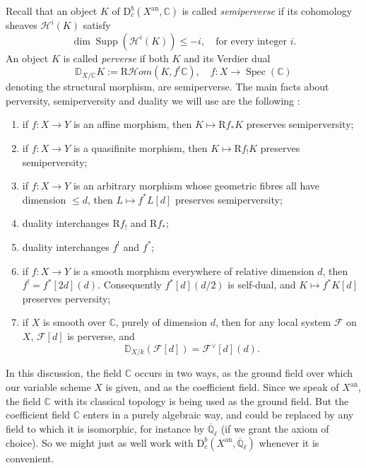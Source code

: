 Recall \cite[Ch.~4]{BBD} that an object \(K\) of
\(\mathrm{D}^b_c(X^{\mathrm{an}},\mathbb{C})\) is called
\emph{semiperverse} if its cohomology sheaves \(\mathcal{H}^i(K)\) satisfy
\[
  \dim\operatorname{Supp}(\mathcal{H}^i(K))\leq -i,
  \quad\text{for every integer }i.
\]
An object \(K\) is called \emph{perverse} if both \(K\) and its Verdier dual
\[
  \mathbb{D}_{X/\mathbb{C}}K:=\mathrm{R}\mathcal{H}om(K,f^!\mathbb{C}),
  \quad f:X\to\operatorname{Spec}(\mathbb{C})
\]
denoting the structural morphism, are semiperverse. The main facts about
perversity, semiperversity and duality we will use are the following
\cite[Ch.~4]{BBD}:
\begin{enumerate}[label=(\arabic*)]
\item if \(f:X\to Y\) is an affine morphism, then \(K\mapsto \mathrm{R}f_*K\) preserves
semiperversity;
\item if \(f:X\to Y\) is a quasifinite morphism, then \(K\mapsto \mathrm{R}f_!K\)
preserves semiperversity;
\item if \(f:X\to Y\) is an arbitrary morphism whose geometric fibres all have
dimension \(\leq d\), then \(L\mapsto f^*L[d]\) preserves semiperversity;
\item duality interchanges \(\mathrm{R}f_!\) and \(\mathrm{R}f_*\);
\item duality interchanges \(f^!\) and \(f^*\);
\item if \(f:X\to Y\) is a smooth morphism everywhere of relative dimension
\(d\), then \(f^!=f^*[2d](d)\). Consequently \(f^*[d](d/2)\) is self-dual, and
\(K\mapsto f^*K[d]\) preserves perversity;
\item if \(X\) is smooth over \(\mathbb{C}\), purely of dimension \(d\), then
for any local system \(\mathcal{F}\) on \(X\), \(\mathcal{F}[d]\) is perverse,
and
\[
  \mathbb{D}_{X/k}(\mathcal{F}[d])=\mathcal{F}^{\vee}[d](d).
\]
\end{enumerate}

In this discussion, the field \(\mathbb{C}\) occurs in two ways, as the ground
field over which our variable scheme \(X\) is given, and as the coefficient
field. Since we speak of \(X^{\mathrm{an}}\), the field \(\mathbb{C}\) with
its classical topology is being used as the ground field. But the coefficient
field \(\mathbb{C}\) enters in a purely algebraic way, and could be replaced by
any field to which it is isomorphic, for instance by
\(\overline{\mathbb{Q}}_\ell\) (if we grant the axiom of choice). So we might
just as well work with
\(\mathrm{D}^b_c(X^{\mathrm{an}},\overline{\mathbb{Q}}_\ell)\) whenever it is
convenient.

